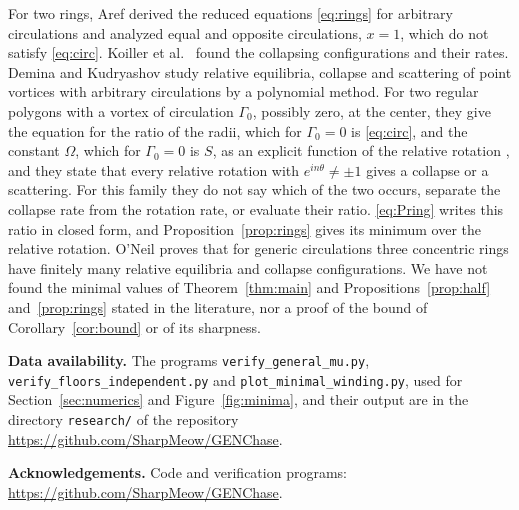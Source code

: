 \documentclass[11pt]{article}
\theoremstyle{definition}
\begin{document}
For two rings, Aref \cite{aref1982} derived the reduced equations \eqref{eq:rings} for arbitrary circulations and analyzed equal and opposite circulations, $x = 1$, which do not satisfy \eqref{eq:circ}. Koiller et al.\ \cite{koiller1985} found the collapsing configurations and their rates. Demina and Kudryashov \cite{dk2014} study relative equilibria, collapse and scattering of point vortices with arbitrary circulations by a polynomial method. For two regular polygons with a vortex of circulation $\Gamma_0$, possibly zero, at the center, they give the equation for the ratio of the radii, which for $\Gamma_0 = 0$ is \eqref{eq:circ}, and the constant $\Omega$, which for $\Gamma_0 = 0$ is $S$, as an explicit function of the relative rotation \cite[Eqs.~(36)--(37)]{dk2014}, and they state that every relative rotation with $e^{in\theta} \neq \pm 1$ gives a collapse or a scattering. For this family they do not say which of the two occurs, separate the collapse rate from the rotation rate, or evaluate their ratio. \eqref{eq:Pring} writes this ratio in closed form, and Proposition~\ref{prop:rings} gives its minimum over the relative rotation. O'Neil \cite{oneil2007} proves that for generic circulations three concentric rings have finitely many relative equilibria and collapse configurations. We have not found the minimal values of Theorem~\ref{thm:main} and Propositions~\ref{prop:half} and~\ref{prop:rings} stated in the literature, nor a proof of the bound of Corollary~\ref{cor:bound} or of its sharpness.

\medskip
\noindent\textbf{Data availability.} The programs \texttt{verify\_general\_mu.py}, \texttt{verify\_floors\_independent.py} and \texttt{plot\_minimal\_winding.py}, used for Section~\ref{sec:numerics} and Figure~\ref{fig:minima}, and their output are in the directory \texttt{research/} of the repository \url{https://github.com/SharpMeow/GENChase}.

\noindent\textbf{Acknowledgements.} Code and verification programs: \url{https://github.com/SharpMeow/GENChase}.

\smallskip
{}
\end{document}
